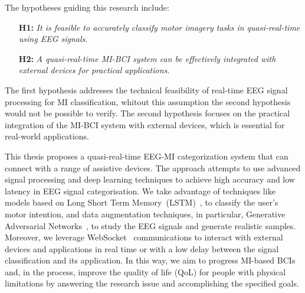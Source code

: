 The hypotheses guiding this research include:
\begin{itemize}
    \item[\textbf{H1:}] \emph{It is feasible to accurately classify motor imagery tasks in quasi-real-time using EEG signals}.
    \item[\textbf{H2:}] \emph{A quasi-real-time MI-BCI system can be effectively integrated with external devices for practical applications}.
\end{itemize}

The first hypothesis addresses the technical feasibility of real-time EEG signal processing for MI classification, whitout this assumption the second hypothesis would not be possible to verify.
The second hypothesis focuses on the practical integration of the MI-BCI system with external devices, which is essential for real-world applications.

This thesis proposes a quasi-real-time EEG-MI categorization system that can connect with a range of assistive devices.
The approach attempts to use advanced signal processing and deep learning techniques to achieve high accuracy and low latency in EEG signal categorisation. 
We take advantage of techniques like models based on Long Short Term Memory~(LSTM)~\cite{hochreiter1997long}, to classify the user's motor intention, and data augmentation techniques, in particular, Generative Adversarial Networks~\cite{goodfellow2014generative}, to study the EEG signals and generate realistic samples.
Moreover, we leverage WebSocket~\cite{fette2011rfc} communications to interact with external devices and applications in real time or with a low delay between the signal classification and its application.
In this way, we aim to progress MI-based BCIs and, in the process, improve the quality of life (QoL) for people with physical limitations by answering the research issue and accomplishing the specified goals.


